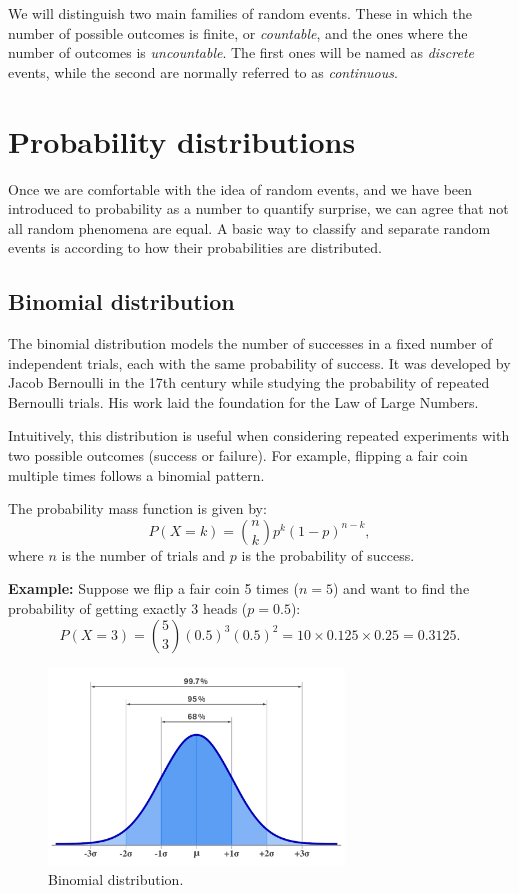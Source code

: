 \documentclass{book}
\begin{document}
We will distinguish two main families of random events. These in which the number of possible outcomes is finite, or \textit{countable}, and the ones where the number of outcomes is \textit{uncountable}. The first ones will be named as \textit{discrete} events, while the second are normally referred to as \textit{continuous}.

\newpage

\section{Probability distributions}
Once we are comfortable with the idea of random events, and we have been introduced to probability as a number to quantify surprise, we can agree that not all random phenomena are equal. A basic way to classify and separate random events is according to how their probabilities are distributed.

\subsection{Binomial distribution}
The binomial distribution models the number of successes in a fixed number of independent trials, each with the same probability of success. It was developed by Jacob Bernoulli in the 17th century while studying the probability of repeated Bernoulli trials. His work laid the foundation for the Law of Large Numbers.

Intuitively, this distribution is useful when considering repeated experiments with two possible outcomes (success or failure). For example, flipping a fair coin multiple times follows a binomial pattern.

The probability mass function is given by:
\begin{equation}
    P(X = k) = \binom{n}{k} p^k (1-p)^{n-k},
\end{equation}
where $n$ is the number of trials and $p$ is the probability of success.

\textbf{Example:} Suppose we flip a fair coin 5 times ($n=5$) and want to find the probability of getting exactly 3 heads ($p=0.5$):
\begin{equation}
    P(X=3) = \binom{5}{3} (0.5)^3 (0.5)^2 = 10 \times 0.125 \times 0.25 = 0.3125.
\end{equation}

\begin{figure}[ht]
    \centering
    \includegraphics[width=0.7\textwidth]{figures/gaussian.png}
    \caption{Binomial distribution.}
    \label{fig:random}
\end{figure}
\end{document}
